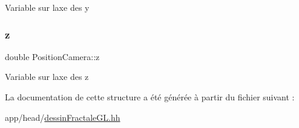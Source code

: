 Variable sur l\textquotesingle{}axe des y \mbox{\label{structPositionCamera_a9fb67025a4671b1f975bef76eb7ad1bb}} 
\subsubsection{\texorpdfstring{z}{z}}
{\footnotesize\ttfamily double Position\+Camera\+::z}

Variable sur l\textquotesingle{}axe des z 

La documentation de cette structure a été générée à partir du fichier suivant \+:\begin{DoxyCompactItemize}
\item 
app/head/\hyperlink{dessinFractaleGL_8hh}{dessin\+Fractale\+G\+L.\+hh}\end{DoxyCompactItemize}
